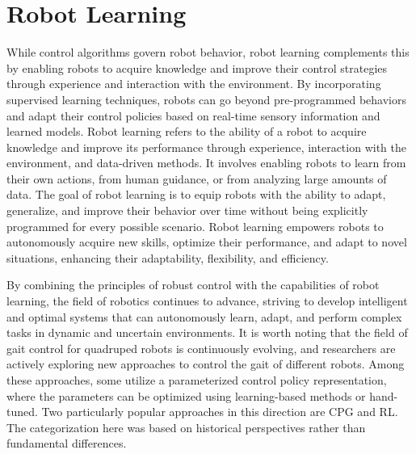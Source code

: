 \section{Robot Learning}
While control algorithms govern robot behavior, robot learning complements this by enabling robots to acquire knowledge and improve their control strategies through experience and interaction with the environment. By incorporating supervised learning techniques, robots can go beyond pre-programmed behaviors and adapt their control policies based on real-time sensory information and learned models\cite{whitehead1991Learning}. Robot learning refers to the ability of a robot to acquire knowledge and improve its performance through experience, interaction with the environment, and data-driven methods. It involves enabling robots to learn from their own actions, from human guidance, or from analyzing large amounts of data. The goal of robot learning is to equip robots with the ability to adapt, generalize, and improve their behavior over time without being explicitly programmed for every possible scenario. Robot learning empowers robots to autonomously acquire new skills, optimize their performance, and adapt to novel situations, enhancing their adaptability, flexibility, and efficiency. 

By combining the principles of robust control with the capabilities of robot learning, the field of robotics continues to advance, striving to develop intelligent and optimal systems that can autonomously learn, adapt, and perform complex tasks in dynamic and uncertain environments. It is worth noting that the field of gait control for quadruped robots is continuously evolving, and researchers are actively exploring new approaches to control the gait of different robots. Among these approaches\cite{nakamura2007Reinforcement, wang2021Hierarchical, lee2006Quadruped, choi2023Learning}, some utilize a parameterized control policy representation, where the parameters can be optimized using learning-based methods or hand-tuned. Two particularly popular approaches in this direction are \ac{CPG} and \ac{RL}. The categorization here was based on historical perspectives rather than fundamental differences.

